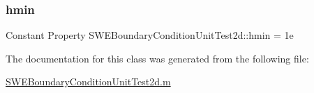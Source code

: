\mbox{\label{class_s_w_e_boundary_condition_unit_test2d_a298fc87be8f78731362ed7657d13cec5}} 
\subsubsection{\texorpdfstring{hmin}{hmin}}
{\footnotesize\ttfamily Constant Property S\+W\+E\+Boundary\+Condition\+Unit\+Test2d\+::hmin = 1e}



The documentation for this class was generated from the following file\+:\begin{DoxyCompactItemize}
\item 
\hyperlink{_s_w_e_boundary_condition_unit_test2d_8m}{S\+W\+E\+Boundary\+Condition\+Unit\+Test2d.\+m}\end{DoxyCompactItemize}
